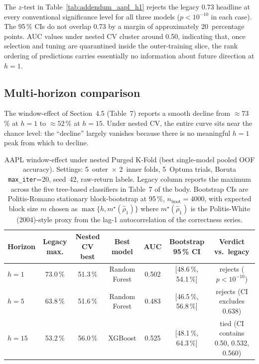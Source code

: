 \documentclass{rQUF2e}
\begin{document}
\noindent The $z$-test in
Table~\ref{tab:addendum_aapl_h1} rejects the legacy 0.73 headline
at every conventional significance level for all three models
($p<10^{-10}$ in each case). The 95\,\% CIs do not overlap 0.73
by a margin of approximately 20~percentage points. AUC values
under nested CV cluster around 0.50, indicating that, once
selection and tuning are quarantined inside the outer-training
slice, the rank ordering of predictions carries essentially no
information about future direction at $h=1$.

\subsection{Multi-horizon comparison}

The window-effect of Section~4.5 (Table~7) reports a smooth
decline from $\approx 73$\,\% at $h=1$ to $\approx 52$\,\% at
$h=15$. Under nested CV, the entire curve sits near the chance
level: the ``decline'' largely vanishes because there is no
meaningful $h=1$ peak from which to decline.

\begin{table}[H]
\centering
\caption{AAPL window-effect under nested Purged K-Fold (best
single-model pooled OOF accuracy). Settings: 5~outer~$\times$
2~inner folds, 5~Optuna trials, Boruta \texttt{max\_iter}=20,
seed~42, raw-return labels. Legacy column reports the maximum
across the five tree-based classifiers in Table~7 of the body.
Bootstrap CIs are Politis-Romano stationary block-bootstrap at
95\,\%, $n_{\text{boot}}=4000$, with expected block size $m$
chosen as $\max\{h, m^{\star}(\hat{\rho}_1)\}$ where
$m^{\star}(\hat{\rho}_1)$ is the Politis-White (2004)-style
proxy from the lag-1 autocorrelation of the correctness series.}
\label{tab:addendum_aapl_window}
\scriptsize
\begin{tabular}{lcccccc}
\toprule
\textbf{Horizon} & \textbf{Legacy max.} & \textbf{Nested CV best} & \textbf{Best model} & \textbf{AUC} & \textbf{Bootstrap 95\,\% CI} & \textbf{Verdict vs.\ legacy} \\
\midrule
$h=1$  & 73.0\,\% & 51.3\,\% & Random Forest & 0.502 & [48.6\,\%, 54.1\,\%] & rejects ($p<10^{-10}$) \\
$h=5$  & 63.8\,\% & 51.6\,\% & Random Forest & 0.483 & [46.5\,\%, 56.8\,\%] & rejects (CI excludes 0.638) \\
$h=15$ & 53.2\,\% & 56.0\,\% & XGBoost       & 0.525 & [48.1\,\%, 64.3\,\%] & tied (CI contains 0.50, 0.532, 0.560) \\
\bottomrule
\end{tabular}
\end{table}
\end{document}
